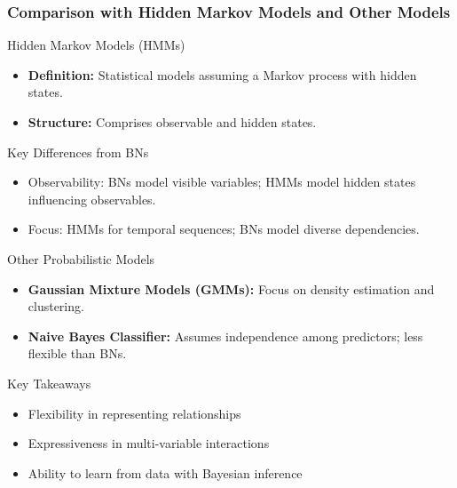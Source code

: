 \documentclass[aspectratio=169]{beamer}
\begin{document}
\begin{frame}[fragile]
    \frametitle{Comparison with Hidden Markov Models and Other Models}

    \begin{block}{Hidden Markov Models (HMMs)}
        \begin{itemize}
            \item \textbf{Definition:} Statistical models assuming a Markov process with hidden states.
            \item \textbf{Structure:} Comprises observable and hidden states.
        \end{itemize}
    \end{block}

    \begin{block}{Key Differences from BNs}
        \begin{itemize}
            \item Observability: BNs model visible variables; HMMs model hidden states influencing observables.
            \item Focus: HMMs for temporal sequences; BNs model diverse dependencies.
        \end{itemize}
    \end{block}

    \begin{block}{Other Probabilistic Models}
        \begin{itemize}
            \item \textbf{Gaussian Mixture Models (GMMs):} Focus on density estimation and clustering.
            \item \textbf{Naive Bayes Classifier:} Assumes independence among predictors; less flexible than BNs.
        \end{itemize}
    \end{block}

    \begin{block}{Key Takeaways}
        \begin{itemize}
            \item Flexibility in representing relationships
            \item Expressiveness in multi-variable interactions
            \item Ability to learn from data with Bayesian inference
        \end{itemize}
    \end{block}
\end{frame}
\end{document}
